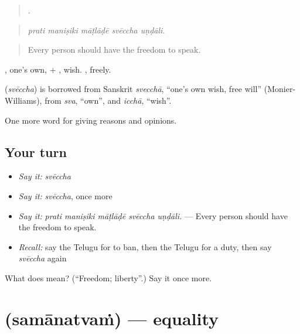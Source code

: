 \begin{quote}
    .
\end{quote}

\begin{quote}
\emph{prati maniṣiki māṭlāḍē svēccha uṇḍāli.}
\end{quote}

\begin{quote}
Every person should have the freedom to speak.
\end{quote}

, one’s own, + , wish. , freely.

\begin{cousinweb}
\textbf{} (\emph{svēccha}) is borrowed from Sanskrit \emph{svecchā}, \textquotedblleft{}one’s own wish, free will\textquotedblright{} (Monier-Williams), from \emph{sva}, \textquotedblleft{}own\textquotedblright{}, and \emph{icchā}, \textquotedblleft{}wish\textquotedblright{}.
\end{cousinweb}

\begin{grammarlens}[title={What you've built}]
One more word for giving reasons and opinions.
\end{grammarlens}

\subsection*{Your turn}
\begin{itemize}
\raggedright
  \item \emph{Say it:} \emph{svēccha}
  \item \emph{Say it:} \emph{svēccha}, once more
  \item \emph{Say it:} \emph{prati maniṣiki māṭlāḍē svēccha uṇḍāli.} — Every person should have the freedom to speak.
  \item \emph{Recall:} say the Telugu for to ban, then the Telugu for a duty, then say \emph{svēccha} again
\end{itemize}

\begin{tcolorbox}[breakable,colback=teal!4,colframe=teal!35!black,title={Before you move on}]
What does  mean? (\textquotedblleft{}Freedom; liberty\textquotedblright{}.) Say it once more.
\end{tcolorbox}
\section[\texorpdfstring{\te{సమానత్వం} (samānatvaṁ)}{సమానత్వం (samānatvaṁ)}]{ (samānatvaṁ) — equality}

